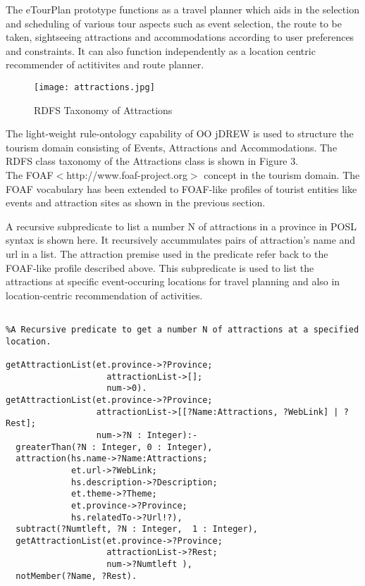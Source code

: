 \documentclass [letterpaper] {Article}
\begin{document}
\begin{small}
\hspace{0.3in}The eTourPlan prototype functions as a travel planner which aids in the selection and scheduling of various tour aspects such as event selection, the route to be taken, sightseeing attractions and accommodations according to user preferences and constraints. It can also function independently as a location centric recommender of actitivites and route planner. 

\begin{figure}
\begin{center}
\texttt{[image: attractions.jpg]}
\caption {RDFS Taxonomy of Attractions}
\label{fig:3Fig2}
\end{center}
\end{figure}

\hspace{0.3in}The light-weight rule-ontology capability of OO jDREW is used to structure the tourism domain consisting of Events, Attractions and Accommodations. The RDFS class taxonomy of the Attractions class is shown in Figure 3.
\\
 
\hspace{0.3in}The FOAF$<$http://www.foaf-project.org$>$ concept in the tourism domain. The FOAF vocabulary has been extended to FOAF-like profiles of tourist entities like events and attraction sites as shown in the previous section.

\hspace{0.3in}A recursive subpredicate to list a number N of attractions in a province in POSL syntax is shown here. It  recursively accummulates pairs of attraction's name and url in a list. The attraction premise used in the predicate refer back to the FOAF-like profile described above. This subpredicate is used to list the attractions at specific event-occuring locations for travel planning and also in location-centric recommendation of activities.
\linebreak 
\linebreak 
\linebreak
\linebreak 
\singlespacing
\begin{small}	       
\begin{verbatim}

%A Recursive predicate to get a number N of attractions at a specified location. 
 
getAttractionList(et.province->?Province;  
	                attractionList->[]; 
	                num->0).
getAttractionList(et.province->?Province;  
                  attractionList->[[?Name:Attractions, ?WebLink] | ?Rest];  
                  num->?N : Integer):-
  greaterThan(?N : Integer, 0 : Integer),
  attraction(hs.name->?Name:Attractions; 
             et.url->?WebLink;  
             hs.description->?Description;  
             et.theme->?Theme;  
             et.province->?Province;  
             hs.relatedTo->?Url!?),
  subtract(?Numtleft, ?N : Integer,  1 : Integer), 
  getAttractionList(et.province->?Province;  
                    attractionList->?Rest;  
                    num->?Numtleft ),
  notMember(?Name, ?Rest).
  

\end{verbatim}
\end{small}
\end{small}
\end{document}

